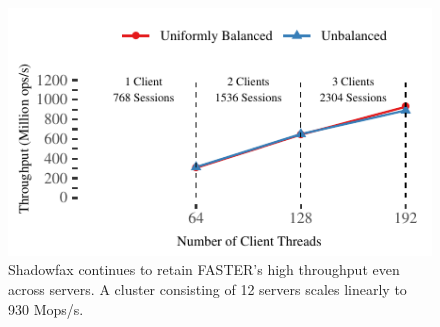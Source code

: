 \begin{figure}[t]
\centering
\includegraphics[width=0.9\columnwidth]{graphs/cloudLab.pdf}
\caption{Shadowfax continues to retain FASTER’s
    high throughput even across servers. A cluster consisting of
    12 servers scales linearly to 930 Mops/s.
}
\label{fig:system-scalability}
\end{figure}

